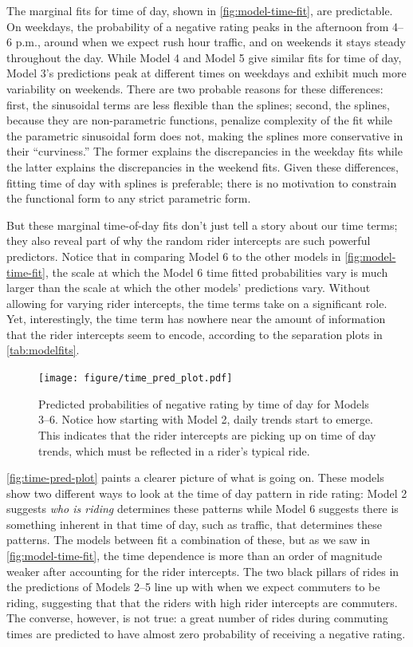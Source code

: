 \documentclass[]{article}
\begin{document}
The marginal fits for time of day, shown in
\autoref{fig:model-time-fit}, are predictable. On weekdays, the
probability of a negative rating peaks in the afternoon from 4--6 p.m.,
around when we expect rush hour traffic, and on weekends it stays steady
throughout the day. While Model 4 and Model 5 give similar fits for time
of day, Model 3's predictions peak at different times on weekdays and
exhibit much more variability on weekends. There are two probable
reasons for these differences: first, the sinusoidal terms are less
flexible than the splines; second, the splines, because they are
non-parametric functions, penalize complexity of the fit while the
parametric sinusoidal form does not, making the splines more
conservative in their ``curviness.'' The former explains the
discrepancies in the weekday fits while the latter explains the
discrepancies in the weekend fits. Given these differences, fitting time
of day with splines is preferable; there is no motivation to constrain
the functional form to any strict parametric form.

But these marginal time-of-day fits don't just tell a story about our
time terms; they also reveal part of why the random rider intercepts are
such powerful predictors. Notice that in comparing Model 6 to the other
models in \autoref{fig:model-time-fit}, the scale at which the Model 6
time fitted probabilities vary is much larger than the scale at which
the other models' predictions vary. Without allowing for varying rider
intercepts, the time terms take on a significant role. Yet,
interestingly, the time term has nowhere near the amount of information
that the rider intercepts seem to encode, according to the separation
plots in \autoref{tab:modelfits}.

\begin{figure}[tbh]
\centering
\texttt{[image: figure/time\_pred\_plot.pdf]}
\caption[Predicted probabilities of negative rating by time of day for Models 3--6]{\normalsize{Predicted probabilities of negative rating by time of day for Models 3--6.
Notice how starting with Model 2, daily trends start to emerge. This indicates that the
rider intercepts are picking up on time of day trends, which must be reflected in a rider's
typical ride.}}
\label{fig:time-pred-plot}
\end{figure}

\autoref{fig:time-pred-plot} paints a clearer picture of what is going
on. These models show two different ways to look at the time of day
pattern in ride rating: Model 2 suggests \emph{who is riding} determines
these patterns while Model 6 suggests there is something inherent in
that time of day, such as traffic, that determines these patterns. The
models between fit a combination of these, but as we saw in
\autoref{fig:model-time-fit}, the time dependence is more than an order
of magnitude weaker after accounting for the rider intercepts. The two
black pillars of rides in the predictions of Models 2--5 line up with
when we expect commuters to be riding, suggesting that that the riders
with high rider intercepts are commuters. The converse, however, is not
true: a great number of rides during commuting times are predicted to
have almost zero probability of receiving a negative rating.
\end{document}
